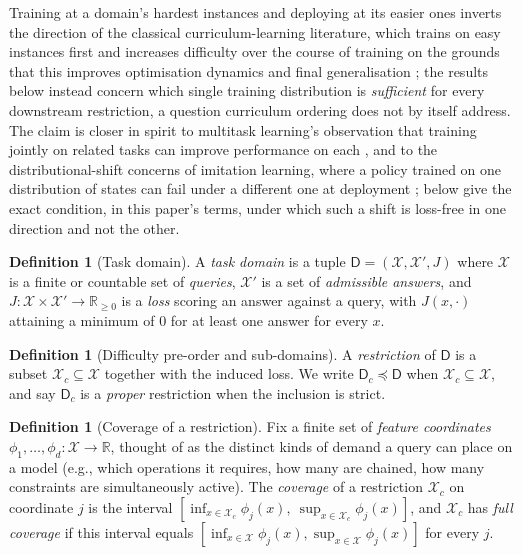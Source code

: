 \documentclass[11pt,twocolumn,a4paper]{article}
\theoremstyle{rdm}
\theoremstyle{definition}
\newtheorem{definition}[theorem]{Definition}
\theoremstyle{remark}
\newcommand{\R}{\mathbb{R}}
\newcommand{\Cands}{\mathcal{X}}
\newcommand{\Dom}{\mathsf{D}}
\begin{document}
Training at a domain's hardest instances and deploying at its easier ones
inverts the direction of the classical curriculum-learning literature, which
trains on easy instances first and increases difficulty over the course of
training on the grounds that this improves optimisation dynamics and final
generalisation \citep{bengio2009curriculum,elman1993}; the results below
instead concern which single training distribution is \emph{sufficient} for
every downstream restriction, a question curriculum ordering does not by
itself address. The claim is closer in spirit to multitask learning's
observation that training jointly on related tasks can improve performance
on each \citep{caruana1997}, and to the distributional-shift concerns of
imitation learning, where a policy trained on one distribution of states can
fail under a different one at deployment \citep{ross2011};  below give the exact
condition, in this paper's terms, under which such a shift is loss-free in
one direction and not the other.

\begin{definition}[Task domain]
\label{def:task-domain}
A \emph{task domain} is a tuple $\Dom = (\Cands, \Cands', J)$ where $\Cands$
is a finite or countable set of \emph{queries}, $\Cands'$ is a set of
\emph{admissible answers}, and $J: \Cands \times \Cands' \to \R_{\ge 0}$ is a
\emph{loss} scoring an answer against a query, with $J(x,\cdot)$ attaining a
minimum of $0$ for at least one answer for every $x$.
\end{definition}

\begin{definition}[Difficulty pre-order and sub-domains]
\label{def:subdomain}
A \emph{restriction} of $\Dom$ is a subset $\Cands_c \subseteq \Cands$
together with the induced loss. We write $\Dom_c \preceq \Dom$ when
$\Cands_c \subseteq \Cands$, and say $\Dom_c$ is a \emph{proper} restriction
when the inclusion is strict.
\end{definition}

\begin{definition}[Coverage of a restriction]
\label{def:coverage}
Fix a finite set of \emph{feature coordinates} $\phi_1,\dots,\phi_d :
\Cands \to \R$, thought of as the distinct kinds of demand a query can place
on a model (e.g., which operations it requires, how many are chained, how
many constraints are simultaneously active). The \emph{coverage} of a
restriction $\Cands_c$ on coordinate $j$ is the interval
$[\inf_{x\in\Cands_c}\phi_j(x),\ \sup_{x\in\Cands_c}\phi_j(x)]$, and
$\Cands_c$ has \emph{full coverage} if this interval equals
$[\inf_{x\in\Cands}\phi_j(x), \sup_{x\in\Cands}\phi_j(x)]$ for every $j$.
\end{definition}
\end{document}
